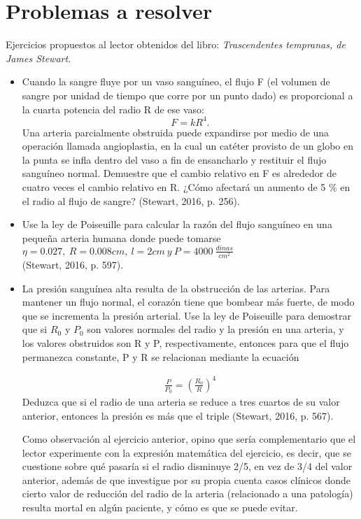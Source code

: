 \chapter{Problemas a resolver}
Ejercicios propuestos al lector obtenidos del libro: \textit{Trascendentes tempranas, de James Stewart.}
\begin{itemize}
 \item Cuando la sangre fluye por un vaso sanguíneo, el flujo F (el
volumen de sangre por unidad de tiempo que corre por un
punto dado) es proporcional a la cuarta potencia del radio R de
ese vaso:
$$F=kR^4.$$
Una arteria parcialmente
obstruida puede expandirse por medio de una operación
llamada angioplastia, en la cual un catéter provisto de un
globo en la punta se infla dentro del vaso a fin de ensancharlo
y restituir el flujo sanguíneo normal.
 Demuestre que el cambio relativo en F es alrededor de cuatro
veces el cambio relativo en R. ¿Cómo afectará un aumento de
5 \% en el radio al flujo de sangre? (Stewart, 2016, p. 256).
\item
Use la ley de Poiseuille para calcular la razón del flujo sanguíneo
en una pequeña arteria humana donde puede tomarse
 $\eta=0.027,\ R=0.008 cm,\ l=2cm\ y\ P=4000\ \tfrac{dinas}{cm^2}$\\ (Stewart, 2016, p. 597).
 \item
 La presión sanguínea alta resulta de la obstrucción de las
arterias. Para mantener un flujo normal, el corazón tiene que
bombear más fuerte, de modo que se incrementa la presión
arterial. Use la ley de Poiseuille para demostrar que si $R_0$ y $P_0$
son valores normales del radio y la presión en una arteria, y
los valores obstruidos son R y P, respectivamente, entonces
para que el flujo permanezca constante, P y R se relacionan
mediante la ecuación

\begin{align*}
    \frac{P}{P_0}=\left(\frac{R_0}{R}\right)^4
\end{align*}
Deduzca que si el radio de una arteria se reduce a tres cuartos
de su valor anterior, entonces la presión es más que el triple (Stewart, 2016, p. 567).

Como observación al ejercicio anterior, opino que sería complementario que el lector experimente con la expresión matemática del ejercicio, es decir, que se cuestione sobre qué pasaría si el radio disminuye 2/5, en vez de 3/4 del valor anterior, además de que investigue por su propia cuenta casos clínicos donde cierto valor de reducción del radio de la arteria (relacionado a una patología) resulta mortal en algún paciente, y cómo es que se puede evitar.
\end{itemize} 